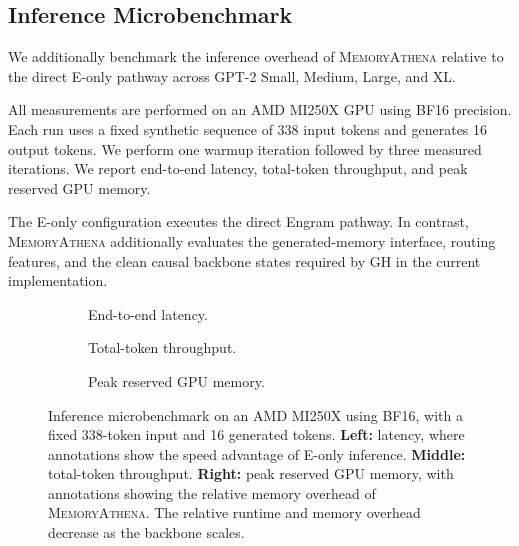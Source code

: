 \subsection{Inference Microbenchmark}

We additionally benchmark the inference overhead of \textsc{MemoryAthena}
relative to the direct E-only pathway across GPT-2 Small, Medium, Large, and XL.

All measurements are performed on an AMD MI250X GPU using BF16 precision.
Each run uses a fixed synthetic sequence of 338 input tokens and generates
16 output tokens. We perform one warmup iteration followed by three measured
iterations. We report end-to-end latency, total-token throughput, and peak
reserved GPU memory.

The E-only configuration executes the direct Engram pathway. In contrast,
\textsc{MemoryAthena} additionally evaluates the generated-memory interface,
routing features, and the clean causal backbone states required by GH in the
current implementation.

\begin{figure}[t]
    \centering

    \begin{subfigure}[t]{0.32\textwidth}
        \centering
        \caption{End-to-end latency.}
        \label{fig:compute-latency}
    \end{subfigure}
    \hfill
    \begin{subfigure}[t]{0.32\textwidth}
        \centering
        \caption{Total-token throughput.}
        \label{fig:compute-throughput}
    \end{subfigure}
    \hfill
    \begin{subfigure}[t]{0.32\textwidth}
        \centering
        \caption{Peak reserved GPU memory.}
        \label{fig:compute-memory}
    \end{subfigure}

    \caption{
    Inference microbenchmark on an AMD MI250X using BF16, with a fixed
    338-token input and 16 generated tokens.
    \textbf{Left:} latency, where annotations show the speed advantage of
    E-only inference.
    \textbf{Middle:} total-token throughput.
    \textbf{Right:} peak reserved GPU memory, with annotations showing the
    relative memory overhead of \textsc{MemoryAthena}.
    The relative runtime and memory overhead decrease as the backbone scales.
    }
    \label{fig:compute-microbenchmark}
\end{figure}

